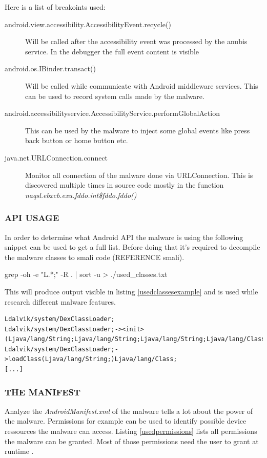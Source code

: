 \documentclass[10pt,titlepage]{article}
\begin{document}
Here is a list of breakoints used:

\begin{description}
\item[android.view.accessibility.AccessibilityEvent.recycle()] Will be called after the accessibility event was processed by the anubis service. In the debugger the full event content is visible
\item[android.os.IBinder.transact()] Will be called while communicate with Android middleware services. This can be used to record system calls made by the malware.
\item[android.accessibilityservice.AccessibilityService.performGlobalAction] This can be used by the malware to inject some global events like press back button or home button etc.
\item[java.net.URLConnection.connect] Monitor all connection of the malware done via URLConnection. This is discovered multiple times in source code mostly in the function \textit{naqsl.ebxcb.exu.fddo.int\$fddo.fddo()}
\end{description}

\subsubsection{API USAGE}
In order to determine what Android API the malware is using the following snippet can be used to get a full list. Before doing that it's required to decompile the malware classes to smali code (REFERENCE smali).

\begin{spverbatim}
grep -oh -e "L.*;"  -R . | sort -u > ./used_classes.txt
\end{spverbatim}

This will produce output visible in listing \ref{usedclassesexample} and is used while research different malware features.

\begin{lstlisting}[label=usedclassesexample,caption=Example output of the API usage script..,frame=tb]
Ldalvik/system/DexClassLoader;
Ldalvik/system/DexClassLoader;-><init>(Ljava/lang/String;Ljava/lang/String;Ljava/lang/String;Ljava/lang/ClassLoader;
Ldalvik/system/DexClassLoader;->loadClass(Ljava/lang/String;)Ljava/lang/Class;
[...]
\end{lstlisting}

\newpage
\subsubsection{THE MANIFEST} \label{manifest}
Analyze the \textit{AndroidManifest.xml} of the malware tells a lot about the power of the malware. Permissions for example can be used to identify possible device ressources the malware can access. Listing \ref{usedpermissions} lists all permissions the malware can be granted. Most of those permissions need the user to grant at runtime \cite[guide/topics/permissions/overview]{AndroidDev}.
\end{document}
